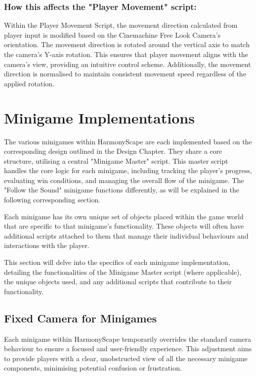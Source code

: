 \documentclass{l4proj}
\begin{document}
\subsubsection{How this affects the "Player Movement" script:} Within the Player Movement Script, the movement direction calculated from player input is modified based on the Cinemachine Free Look Camera's orientation. The movement direction is rotated around the vertical axis to match the camera's Y-axis rotation. This ensures that player movement aligns with the camera's view, providing an intuitive control scheme. Additionally, the movement direction is normalised to maintain consistent movement speed regardless of the applied rotation.

\section{Minigame Implementations}
The various minigames within HarmonyScape are each implemented based on the corresponding design outlined in the Design Chapter. They share a core structure, utilising a central "Minigame Master" script. This master script handles the core logic for each minigame, including tracking the player's progress, evaluating win conditions, and managing the overall flow of the minigame. The "Follow the Sound" minigame functions differently, as will be explained in the following corresponding section. 

Each minigame has its own unique set of objects placed within the game world that are specific to that minigame's functionality. These objects will often have additional scripts attached to them that manage their individual behaviours and interactions with the player.

This section will delve into the specifics of each minigame implementation, detailing the functionalities of the Minigame Master script (where applicable), the unique objects used, and any additional scripts that contribute to their functionality.

\subsection{Fixed Camera for Minigames}
Each minigame within HarmonyScape temporarily overrides the standard camera behaviour to ensure a focused and user-friendly experience. This adjustment aims to provide players with a clear, unobstructed view of all the necessary minigame components, minimising potential confusion or frustration.
\newline
\end{document}
